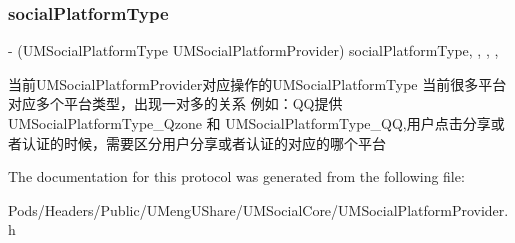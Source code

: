 \subsubsection{\texorpdfstring{social\+Platform\+Type}{socialPlatformType}}
{\footnotesize\ttfamily -\/ (U\+M\+Social\+Platform\+Type U\+M\+Social\+Platform\+Provider) social\+Platform\+Type\hspace{0.3cm}{\ttfamily [read]}, {\ttfamily [write]}, {\ttfamily [optional]}, {\ttfamily [nonatomic]}, {\ttfamily [assign]}}

当前\+U\+M\+Social\+Platform\+Provider对应操作的\+U\+M\+Social\+Platform\+Type  当前很多平台对应多个平台类型，出现一对多的关系 例如：\+Q\+Q提供\+U\+M\+Social\+Platform\+Type\+\_\+\+Qzone 和 U\+M\+Social\+Platform\+Type\+\_\+\+QQ,用户点击分享或者认证的时候，需要区分用户分享或者认证的对应的哪个平台 

The documentation for this protocol was generated from the following file\+:\begin{DoxyCompactItemize}
\item 
Pods/\+Headers/\+Public/\+U\+Meng\+U\+Share/\+U\+M\+Social\+Core/U\+M\+Social\+Platform\+Provider.\+h\end{DoxyCompactItemize}
